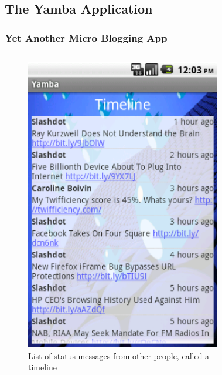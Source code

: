 \subsection{The Yamba Application}
\begin{frame}
\frametitle{Yet Another Micro Blogging App}
\begin{columns}
	\begin{figure}
	\includegraphics[width= 0.8 \textwidth]{fig-30.eps}
	\caption{List of status messages from other people, called a timeline}
	\end{figure}
	\begin{figure}

\end{figure}
\end{columns}
\end{frame}
